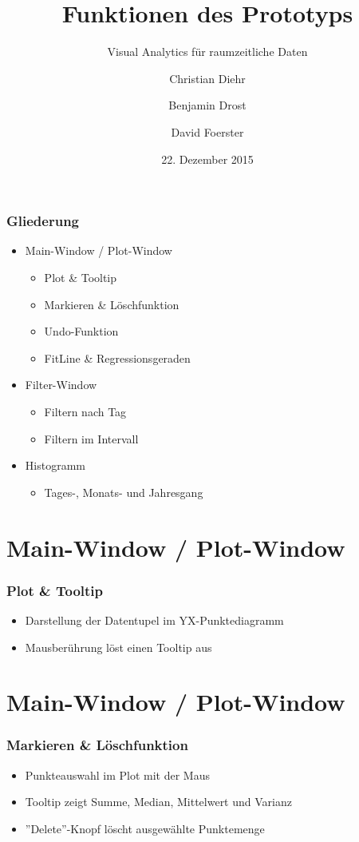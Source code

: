 \documentclass{beamer}
\title{Funktionen des Prototyps}
\subtitle{Visual Analytics für raumzeitliche Daten}
\author{Christian Diehr \and Benjamin Drost \and David Foerster}
\institute{Institut für Informatik\\Humboldt-Universität zu Berlin}
\date{22. Dezember 2015}
\begin{document}
    \begin{frame}
        \titlepage
    \end{frame}
    \logo %
    
    \section{}
    \begin{frame}
	    \frametitle{Gliederung}
			\begin{itemize}
			\item Main-Window / Plot-Window
				\begin{itemize}
				\item Plot \& Tooltip
				\item Markieren \& Löschfunktion
				\item Undo-Funktion
				\item FitLine \& Regressionsgeraden
				\end{itemize}
			\item Filter-Window
				\begin{itemize}
				\item Filtern nach Tag
				\item Filtern im Intervall
				\end{itemize}
			\item Histogramm
				\begin{itemize}
				\item Tages-, Monats- und Jahresgang
				\end{itemize}
			\end{itemize}
    \end{frame}

    \section{Main-Window / Plot-Window}
    \begin{frame}
	    \frametitle{Plot \& Tooltip}
			\begin{itemize}
			\setlength\itemsep{1em}
			\item Darstellung der Datentupel im YX-Punktediagramm
			\item Mausberührung löst einen Tooltip aus
			\end{itemize}
    \end{frame}

    \section{Main-Window / Plot-Window}
    \begin{frame}
			\frametitle{Markieren \& Löschfunktion}
			\begin{itemize}
				\setlength\itemsep{1em}
				\item Punkteauswahl im Plot mit der Maus
				\item Tooltip zeigt Summe, Median, Mittelwert und Varianz
				\item ''Delete''-Knopf löscht ausgewählte Punktemenge
			\end{itemize}
    \end{frame}
    
\end{document}
